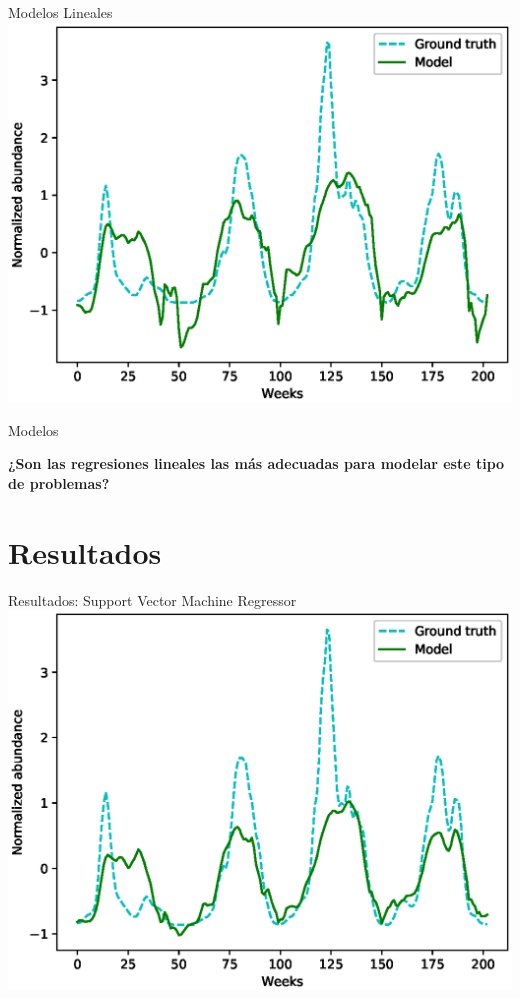 \documentclass[10pt]{beamer}
\begin{document}
\begin{frame}{Modelos Lineales}
  \includegraphics[width=\textwidth]{linear.eps}
\end{frame}

\begin{frame}{Modelos}
  \begin{center}
    \textbf{¿Son las regresiones lineales las más adecuadas para modelar este
      tipo de problemas?}
  \end{center}
\end{frame}

\section{Resultados}

\begin{frame}{Resultados: Support Vector Machine Regressor}
  \includegraphics[width=\textwidth]{svr.eps}
\end{frame}
\end{document}

